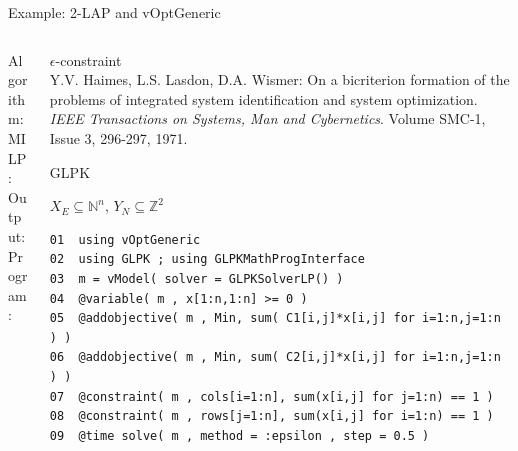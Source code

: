\documentclass[10pt,xcolor=dvipsnames]{beamer}
\newcommand{\mN}{\mathbb{N}}
\newcommand{\Z}{\mathbb{Z}}
\begin{document}
\begin{frame}[fragile=singleslide]{Example: 2-LAP and vOptGeneric}

\vspace{5mm}
\begin{columns}
%
\begin{column}{0.15\textwidth}
Algorithm: \\
\vspace{18mm}
MILP:\\  
\vspace{2mm}
Output: \\
\vspace{6mm}
Program:
\vspace{30mm}
\end{column}
\begin{column}{0.85\textwidth}
         $\epsilon$-constraint \vspace{1mm}\\
         {\footnotesize Y.V. Haimes, L.S. Lasdon, D.A. Wismer: On a bicriterion formation of the problems of integrated system identification and system optimization. 
         \textit{IEEE Transactions on Systems, Man and Cybernetics}. Volume SMC-1, Issue 3, 296-297, 1971.\\}
\medskip

         GLPK
\medskip

$X_E \subseteq \mN^n$, $Y_N \subseteq \Z^2$
\vspace{3mm}

{\footnotesize
\begin{verbatim}
01  using vOptGeneric
02  using GLPK ; using GLPKMathProgInterface
03  m = vModel( solver = GLPKSolverLP() )
04  @variable( m , x[1:n,1:n] >= 0 )
05  @addobjective( m , Min, sum( C1[i,j]*x[i,j] for i=1:n,j=1:n ) )
06  @addobjective( m , Min, sum( C2[i,j]*x[i,j] for i=1:n,j=1:n ) )
07  @constraint( m , cols[i=1:n], sum(x[i,j] for j=1:n) == 1 )
08  @constraint( m , rows[j=1:n], sum(x[i,j] for i=1:n) == 1 )
09  @time solve( m , method = :epsilon , step = 0.5 )
\end{verbatim}
}


          
\end{column}
%
\end{columns}         

       
\end{frame}
\end{document}
